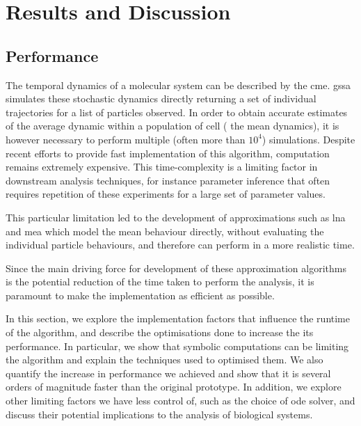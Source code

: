 \section{Results and Discussion} \label{results}



\subsection{Performance}\label{performance}
The temporal dynamics of a molecular system can be described by the \acrfull{cme}\cite{kampen_stochastic_2011}.
\acrfull{gssa}\cite{gillespie_general_1976} simulates these stochastic dynamics directly returning a set of individual trajectories for a list of particles observed.
In order to obtain accurate estimates of the average dynamic within a population of cell (\ie{} the mean dynamics), it is however necessary to perform multiple (often more than $10^4$) simulations.
Despite recent efforts \cite{niemi_efficient_2011,dittamo_optimized_2009,komarov_accelerating_2012} to provide fast implementation of this algorithm, computation remains extremely expensive. 
This time-complexity is a limiting factor in downstream analysis techniques, for
instance parameter inference that often requires repetition of these experiments for a large set of parameter values.

This particular limitation led to the development of approximations such as \acrfull{lna}\cite{komorowski_bayesian_2009} and \acrfull{mea}\cite{ale_general_2013}
 which model the mean behaviour directly, without evaluating the individual particle behaviours, and therefore can perform in a more realistic time.

Since the main driving force for development of these approximation algorithms is the potential reduction of the time taken to perform the analysis, 
it is paramount to make the implementation as efficient as possible.

In this section, we explore the implementation factors that influence the runtime of the algorithm, and describe the optimisations done to increase the its performance.
In particular, we show that symbolic computations can be limiting the algorithm and explain the techniques used to optimised them.
We also quantify the increase in performance we achieved and show that it is several orders of magnitude faster than the original \mat{} prototype.
In addition, we explore other limiting factors we have less control of, such as the choice of \gls{ode} solver, and discuss their potential implications to the analysis of biological systems.

